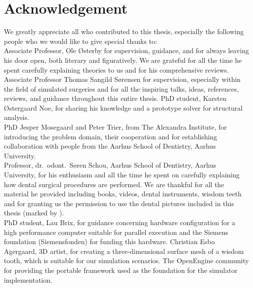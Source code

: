 
\chapter*{Acknowledgement}
We greatly appreciate all who contributed to this thesis,
especially the following people who we would like to give special
thanks to: \\ 

Associate Professor, Ole Østerby for supervision, guidance, and
for always leaving his door open, both literary and figuratively. We
are grateful for all the time he spent carefully explaining theories
to us and for his comprehensive reviews. 
%
Associate Professor Thomas Sangild Sørensen for supervision, especially within the field
of simulated surgeries and for all the inspiring talks, ideas,
references, reviews, and guidance throughout this entire thesis.
%
PhD student, Karsten Østergaard Noe, for sharing his knowledge and
a prototype solver for structural analysis. \\

PhD Jesper Mosegaard and Peter Trier, from The Alexandra
Institute, for introducing the problem domain, their cooperation and
for establishing collaboration with people from the Aarhus School of
Dentistry, Aarhus University. \\

Professor, dr.~odont.~Søren Schou, Aarhus School of Dentistry, Aarhus
University, for his enthusiasm and all the time he spent on carefully
explaining how dental surgical procedures are performed. We are
thankful for all the material he provided including books, videos,
dental instruments, wisdom teeth and for granting us the permission to
use the dental pictures included in this thesis (marked by \textdagger). \\

PhD student, Lau Brix, for guidance concerning hardware
configuration for a high performance computer suitable for parallel
execution
%
and the Siemens foundation (Siemensfonden) for funding this
hardware.
%
Christian Esbo Agergaard, 3D artist, for creating a three-dimensional
surface mesh of a wisdom tooth, which is suitable for our simulation
scenarios.
%
The OpenEngine community for providing the portable framework used as
the foundation for the simulator implementation.
